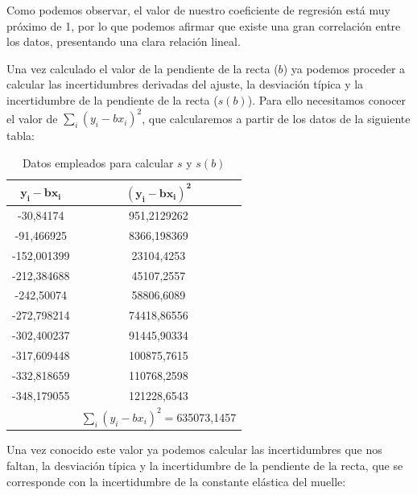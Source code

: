 \documentclass[a4paper,12pt,titlepage]{report}
\begin{document}
Como podemos observar, el valor de nuestro coeficiente de regresión está muy próximo de 1, por lo que podemos afirmar que existe una gran correlación entre los datos, presentando una clara relación lineal.

\par Una vez calculado el valor de la pendiente de la recta ($b$) ya podemos proceder a calcular las incertidumbres derivadas del ajuste, la desviación típica y la incertidumbre de la pendiente de la recta ($s(b)$). Para ello necesitamos conocer el valor de $\sum_i(y_i-bx_i)^2$, que calcularemos a partir de los datos de la siguiente tabla:

\begin{table}[h!]
    \centering
    \begin{tabular}{c|c|}
    \hline
    \multicolumn{1}{|c|}{$\mathbf{y_i-bx_i}$}  & $\mathbf{(y_i-bx_i)^2}$\\ \hline
    \multicolumn{1}{|c|}{-30,84174}   & 951,2129262 \\ \hline
    \multicolumn{1}{|c|}{-91,466925}  & 8366,198369 \\ \hline
    \multicolumn{1}{|c|}{-152,001399} & 23104,4253  \\ \hline
    \multicolumn{1}{|c|}{-212,384688} & 45107,2557  \\ \hline
    \multicolumn{1}{|c|}{-242,50074}  & 58806,6089  \\ \hline
    \multicolumn{1}{|c|}{-272,798214} & 74418,86556 \\ \hline
    \multicolumn{1}{|c|}{-302,400237} & 91445,90334 \\ \hline
    \multicolumn{1}{|c|}{-317,609448} & 100875,7615 \\ \hline
    \multicolumn{1}{|c|}{-332,818659} & 110768,2598 \\ \hline
    \multicolumn{1}{|c|}{-348,179055} & 121228,6543 \\ \hline
                                      & $\sum_i(y_i-bx_i)^2=$635073,1457 \\ \cline{2-2} 
    \end{tabular}
    \caption{Datos empleados para calcular $s$ y $s(b)$}
    \label{tab:my-table}
    \end{table}

\newpage
Una vez conocido este valor ya podemos calcular las incertidumbres que nos faltan, la desviación típica y la incertidumbre de la pendiente de la recta, que se corresponde con la incertidumbre de la constante elástica del muelle:
\end{document}
